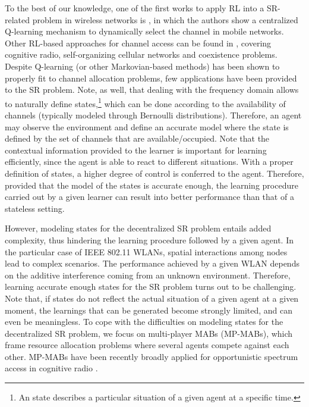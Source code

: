 \documentclass{article}
\begin{document}
To the best of our knowledge, one of the first works to apply RL into a SR-related problem in wireless networks is \cite{nie1999q}, in which the authors show a centralized Q-learning mechanism to dynamically select the channel in mobile networks. Other RL-based approaches for channel access can be found in \cite{li2009multi, bennis2010q, bennis2011distributed, sallent2015learning, rupasinghe2015reinforcement}, covering cognitive radio, self-organizing cellular networks and coexistence problems. Despite Q-learning (or other Markovian-based methods) has been shown to properly fit to channel allocation problems, few applications have been provided to the SR problem. Note, as well, that dealing with the frequency domain allows to naturally define states,\footnote{An state describes a particular situation of a given agent at a specific time.} which can be done according to the availability of channels (typically modeled through Bernoulli distributions). Therefore, an agent may observe the environment and define an accurate model where the state is defined by the set of channels that are available/occupied. Note that the contextual information provided to the learner is important for learning efficiently, since the agent is able to react to different situations. With a proper definition of states, a higher degree of control is conferred to the agent. Therefore, provided that the model of the states is accurate enough, the learning procedure carried out by a given learner can result into better performance than that of a stateless setting. 

However, modeling states for the decentralized SR problem entails added complexity, thus hindering the learning procedure followed by a given agent. In the particular case of IEEE 802.11 WLANs, spatial interactions among nodes lead to complex scenarios. The performance achieved by a given WLAN depends on the additive interference coming from an unknown environment. Therefore, learning accurate enough states for the SR problem turns out to be challenging. Note that, if states do not reflect the actual situation of a given agent at a given moment, the learnings that can be generated become strongly limited, and can even be meaningless. To cope with the difficulties on modeling states for the decentralized SR problem, we focus on multi-player MABs (MP-MABs), which frame resource allocation problems where several agents compete against each other. MP-MABs have been recently broadly applied for opportunistic spectrum access in cognitive radio \cite{liu2010distributed, anandkumar2011distributed, rosenski2016multi, maghsudi2015joint, maghsudi2015channel}. 
\end{document}
